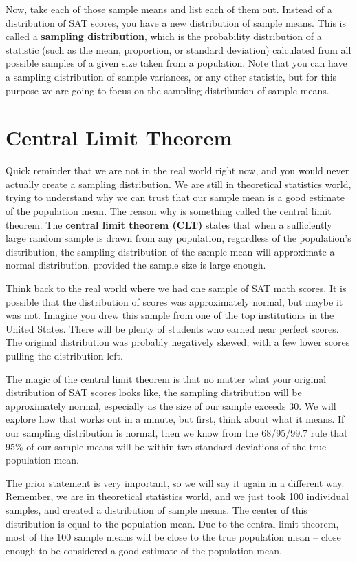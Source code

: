 \documentclass[
  letterpaper,
  DIV=11,
  numbers=noendperiod]{scrreprt}
\begin{document}
Now, take each of those sample means and list each of them out. Instead
of a distribution of SAT scores, you have a new distribution of sample
means. This is called a \textbf{sampling distribution}, which is the
probability distribution of a statistic (such as the mean, proportion,
or standard deviation) calculated from all possible samples of a given
size taken from a population. Note that you can have a sampling
distribution of sample variances, or any other statistic, but for this
purpose we are going to focus on the sampling distribution of sample
means.

\section{Central Limit Theorem}\label{central-limit-theorem}

Quick reminder that we are not in the real world right now, and you
would never actually create a sampling distribution. We are still in
theoretical statistics world, trying to understand why we can trust that
our sample mean is a good estimate of the population mean. The reason
why is something called the central limit theorem. The \textbf{central
limit theorem (CLT)} states that when a sufficiently large random sample
is drawn from any population, regardless of the population's
distribution, the sampling distribution of the sample mean will
approximate a normal distribution, provided the sample size is large
enough.

Think back to the real world where we had one sample of SAT math scores.
It is possible that the distribution of scores was approximately normal,
but maybe it was not. Imagine you drew this sample from one of the top
institutions in the United States. There will be plenty of students who
earned near perfect scores. The original distribution was probably
negatively skewed, with a few lower scores pulling the distribution
left.

The magic of the central limit theorem is that no matter what your
original distribution of SAT scores looks like, the sampling
distribution will be approximately normal, especially as the size of our
sample exceeds 30. We will explore how that works out in a minute, but
first, think about what it means. If our sampling distribution is
normal, then we know from the 68/95/99.7 rule that 95\% of our sample
means will be within two standard deviations of the true population
mean.

The prior statement is very important, so we will say it again in a
different way. Remember, we are in theoretical statistics world, and we
just took 100 individual samples, and created a distribution of sample
means. The center of this distribution is equal to the population mean.
Due to the central limit theorem, most of the 100 sample means will be
close to the true population mean -- close enough to be considered a
good estimate of the population mean.
\end{document}
